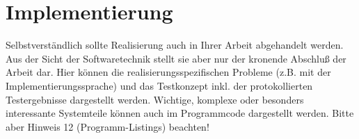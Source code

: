 
\chapter{Implementierung} %

\label{ch:implementierung} %


Selbstverständlich sollte Realisierung auch in Ihrer Arbeit abgehandelt werden.
Aus der Sicht der Softwaretechnik stellt sie aber nur der kronende Abschluß der
Arbeit dar. Hier können die realisierungsspezifischen Probleme (z.B. mit der
Implementierungssprache) und das Testkonzept inkl. der protokollierten
Testergebnisse dargestellt werden. Wichtige, komplexe oder besonders
interessante Systemteile können auch im Programmcode dargestellt werden. Bitte
aber Hinweis 12 (Programm-Listings) beachten!
